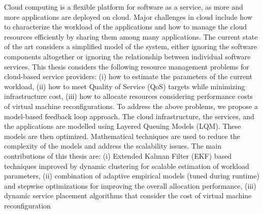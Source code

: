 Cloud computing is a flexible platform for software as a service, as more and more applications are deployed on cloud. Major challenges in cloud include how to characterize the workload of the applications and how to manage the cloud resources efficiently by sharing them among many applications. The current state of the art considers a simplified model of the system, either ignoring the software components altogether or ignoring the relationship between individual software services.  This thesis considers the following resource management problems for cloud-based service providers: (i) how to estimate the parameters of the current workload, (ii) how to meet Quality of Service (QoS) targets while minimizing infrastructure cost, (iii) how to allocate resources considering performance costs of virtual machine reconfigurations. To address the above problems, we propose a model-based feedback loop approach. The cloud infrastructure, the services, and the applications are modelled using Layered Queuing Models (LQM). These models are then optimized. Mathematical techniques are used to reduce the complexity of the models and address the scalability issues. The main contributions of this thesis are:  (i) Extended Kalman Filter (EKF) based techniques improved by dynamic clustering for scalable estimation of workload parameters, (ii) combination of adaptive empirical models (tuned during runtime) and stepwise optimizations for improving the overall allocation performance, (iii) dynamic service placement algorithms that consider the cost of virtual machine reconfiguration  


